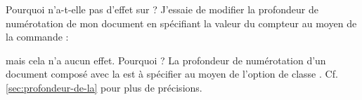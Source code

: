 \begin{dbfaq}{Pourquoi \protect{} n'a-t-elle pas
    d'effet sur \protect{} ?}{}
  J'essaie de modifier la profondeur de numérotation de mon document en
  spécifiant la valeur du compteur  au moyen de la
  commande :
\begin{preamblecode}
\end{preamblecode}
  mais cela n'a aucun effet. Pourquoi ?
  \tcblower
  La profondeur de numérotation d'un document composé avec la \yatcl{} est
  à spécifier au moyen de l'option de classe
  . Cf. \vref{sec:profondeur-de-la} pour plus de
  précisions.
\end{dbfaq}

%
\iffalse
\fi

